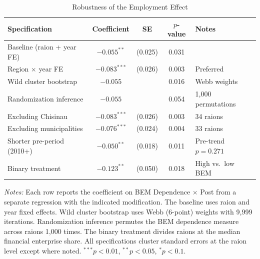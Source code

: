 \begin{table}[htbp]
\centering
\begin{threeparttable}
\caption{Robustness of the Employment Effect}
\label{tab:robust}
\begin{tabular}{lcccl}
\hline\hline
Specification & Coefficient & SE & $p$-value & Notes \\
\hline
Baseline (raion + year FE) & $-0.055^{**}$ & (0.025) & 0.031 & \\
Region $\times$ year FE & $-0.083^{***}$ & (0.026) & 0.003 & Preferred \\
Wild cluster bootstrap & $-0.055$ & & 0.016 & Webb weights \\
Randomization inference & $-0.055$ & & 0.054 & 1{,}000 permutations \\
Excluding Chisinau & $-0.083^{***}$ & (0.026) & 0.003 & 34 raions \\
Excluding municipalities & $-0.076^{***}$ & (0.024) & 0.004 & 33 raions \\
Shorter pre-period (2010+) & $-0.050^{**}$ & (0.018) & 0.011 & Pre-trend $p = 0.271$ \\
Binary treatment & $-0.123^{**}$ & (0.050) & 0.018 & High vs.\ low BEM \\
\hline\hline
\end{tabular}
\begin{tablenotes}[flushleft]\small
\item \textit{Notes:} Each row reports the coefficient on BEM Dependence $\times$ Post from a separate regression with the indicated modification. The baseline uses raion and year fixed effects. Wild cluster bootstrap uses Webb (6-point) weights with 9,999 iterations. Randomization inference permutes the BEM dependence measure across raions 1,000 times. The binary treatment divides raions at the median financial enterprise share. All specifications cluster standard errors at the raion level except where noted. $^{***}p<0.01$, $^{**}p<0.05$, $^{*}p<0.1$.
\end{tablenotes}
\end{threeparttable}
\end{table}
